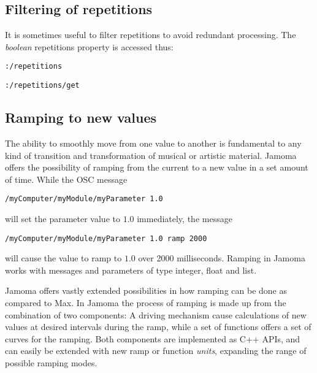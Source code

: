 \documentclass{NIME-alternate}
\begin{document}




\subsection{Filtering of repetitions} %
\label{sub:filtering_of_repetitions}

It is sometimes useful to filter repetitions to avoid redundant processing. The \emph{boolean} repetitions property is accessed thus:

\texttt{:/repetitions}

\texttt{:/repetitions/get}





\subsection{Ramping to new values} %
\label{sub:ramping_to_new_values}

The ability to smoothly move from one value to another is fundamental to any kind of transition and transformation of musical or artistic material. Jamoma offers the possibility of ramping from the current to a new value in a set amount of time. While the OSC message

\texttt{/myComputer/myModule/myParameter 1.0}

\noindent
will set the parameter value to $1.0$ immediately, the message

\texttt{/myComputer/myModule/myParameter 1.0 ramp 2000}

\noindent
will cause the value to ramp to $1.0$ over 2000 milliseconds. Ramping in Jamoma works with messages and parameters of type integer, float and list.

Jamoma offers vastly extended possibilities in how ramping can be done as compared to Max. In Jamoma the process of ramping is made up from the combination of two components: A driving mechanism cause calculations of new values at desired intervals during the ramp, while a set of functions offers a set of curves for the ramping. Both components are implemented as C++ APIs, and can easily be extended with new ramp or function \emph{units}, expanding the range of possible ramping modes.
\end{document}

